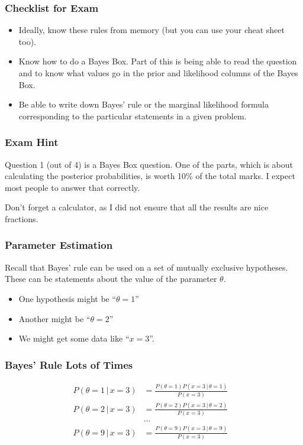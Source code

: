 \documentclass{beamer}
\newcommand{\given}{\,|\,}
\begin{document}
\begin{frame}
\frametitle{Checklist for Exam}

\begin{itemize}
\item Ideally, know these rules from memory (but you can use your cheat sheet
too).\pause
\item Know how to do a Bayes Box. Part of this is being able to read the
question and to know what values go in the prior
and likelihood columns of the Bayes Box.\pause
\item Be able to write down Bayes' rule or the marginal likelihood formula
corresponding to the particular statements in a given problem.
\end{itemize}


\end{frame}

\begin{frame}
\frametitle{Exam Hint}
Question 1 (out of 4) is a Bayes Box question. One of the parts, which is
about calculating the posterior probabilities, is worth 10\% of the total
marks. I expect most people to answer that correctly.\pause

Don't forget a calculator, as I did not ensure that all the results are
nice fractions.

\end{frame}


\begin{frame}
\frametitle{Parameter Estimation}
Recall that Bayes' rule can be used on a set of mutually exclusive hypotheses.
These can be statements about the value of the parameter $\theta$.\pause

\begin{itemize}
\item One hypothesis might be ``$\theta = 1$'' \pause
\item Another might be ``$\theta = 2$'' \pause
\item We might get some data like ``$x = 3$''.
\end{itemize}

\end{frame}


\begin{frame}
\frametitle{Bayes' Rule Lots of Times}
\begin{align}
P(\theta = 1 \given x = 3) &= \frac{P(\theta=1)P(x=3 \given \theta=1)}{P(x=3)}\\
P(\theta = 2 \given x = 3) &= \frac{P(\theta=2)P(x=3 \given \theta=2)}{P(x=3)}\\
&...&\\
P(\theta = 9 \given x = 3) &= \frac{P(\theta=9)P(x=3 \given \theta=9)}{P(x=3)}\\
\end{align}

\end{frame}
\end{document}
